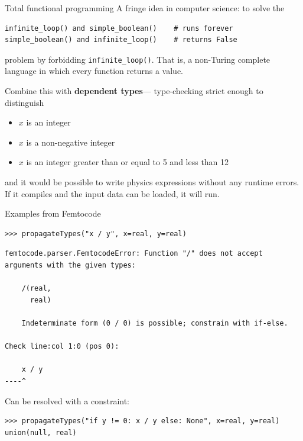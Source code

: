 \documentclass[aspectratio=169]{beamer}
\begin{document}
\begin{frame}[fragile]{Total functional programming}
\vspace{0.5 cm}
A fringe idea in computer science: to solve the

\small
\begin{center}
\begin{minipage}{0.8\linewidth}
\begin{verbatim}
infinite_loop() and simple_boolean()    # runs forever
simple_boolean() and infinite_loop()    # returns False
\end{verbatim}
\end{minipage}
\end{center}

\normalsize
problem by forbidding \texttt{infinite_loop()}. That is, a non-Turing complete language in which every function returns a value.

\vspace{0.5 cm}
Combine this with {\bf dependent types}--- type-checking strict enough to distinguish
\begin{itemize}
\item $x$ is an integer
\item $x$ is a non-negative integer
\item $x$ is an integer greater than or equal to 5 and less than 12
\end{itemize}

and it would be possible to write physics expressions without any runtime errors. If it compiles and the input data can be loaded, it will run.
\end{frame}

\begin{frame}[fragile]{Examples from Femtocode}
\small
\begin{verbatim}
>>> propagateTypes("x / y", x=real, y=real)
\end{verbatim}
{\color{red}
\begin{verbatim}
femtocode.parser.FemtocodeError: Function "/" does not accept
arguments with the given types:

    /(real,
      real)

    Indeterminate form (0 / 0) is possible; constrain with if-else.

Check line:col 1:0 (pos 0):

    x / y
----^
\end{verbatim}}

{\normalsize Can be resolved with a constraint:}

\begin{verbatim}
>>> propagateTypes("if y != 0: x / y else: None", x=real, y=real)
union(null, real)
\end{verbatim}
\end{frame}
\end{document}
